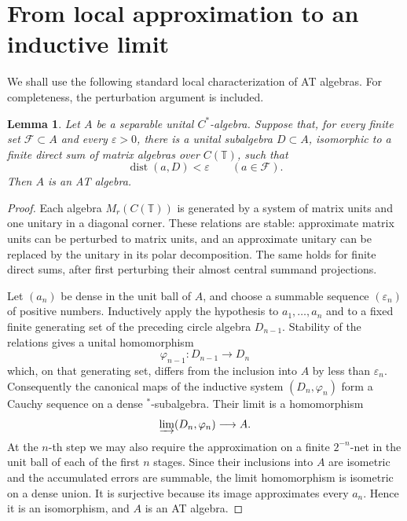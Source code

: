 \documentclass{book}
\newtheorem{lemma}[definition]{Lemma}
\def\cstar{\(C^*\)-algebra}
\begin{document}
\section{From local approximation to an inductive limit}

We shall use the following standard local characterization of AT algebras.
For completeness, the perturbation argument is included.

\begin{lemma}\label{lemma:LocalCircleApproximationAT}
  Let \(A\) be a separable unital \cstar. Suppose that, for every finite
  set \(\mathcal F\subset A\) and every \(\varepsilon>0\), there is a
  unital subalgebra \(D\subset A\), isomorphic to a finite direct sum of
  matrix algebras over \(C(\mathbb T)\), such that
  \[
    \operatorname{dist}(a,D)<\varepsilon
    \qquad(a\in\mathcal F).
  \]
  Then \(A\) is an AT algebra.
\end{lemma}

\begin{proof}
  Each algebra \(M_r(C(\mathbb T))\) is generated by a system of matrix
  units and one unitary in a diagonal corner. These relations are stable:
  approximate matrix units can be perturbed to matrix units, and an
  approximate unitary can be replaced by the unitary in its polar
  decomposition. The same holds for finite direct sums, after first
  perturbing their almost central summand projections.

  Let \((a_n)\) be dense in the unit ball of \(A\), and choose a summable
  sequence \((\varepsilon_n)\) of positive numbers. Inductively apply the
  hypothesis to \(a_1,\ldots,a_n\) and to a fixed finite generating set of
  the preceding circle algebra \(D_{n-1}\). Stability of the relations
  gives a unital homomorphism
  \[
    \varphi_{n-1}\colon D_{n-1}\longrightarrow D_n
  \]
  which, on that generating set, differs from the inclusion into \(A\) by
  less than \(\varepsilon_n\). Consequently the canonical maps of the
  inductive system \((D_n,\varphi_n)\) form a Cauchy sequence on a dense
  \(^*\)-subalgebra. Their limit is a homomorphism
  \[
    \varinjlim(D_n,\varphi_n)\longrightarrow A.
  \]
  At the \(n\)-th step we may also require the approximation on a finite
  \(2^{-n}\)-net in the unit ball of each of the first \(n\) stages. Since
  their inclusions into \(A\) are isometric and the accumulated errors are
  summable, the limit homomorphism is isometric on a dense union. It is
  surjective because its image approximates every \(a_n\). Hence it is an
  isomorphism, and \(A\) is an AT algebra.
\end{proof}
\end{document}
